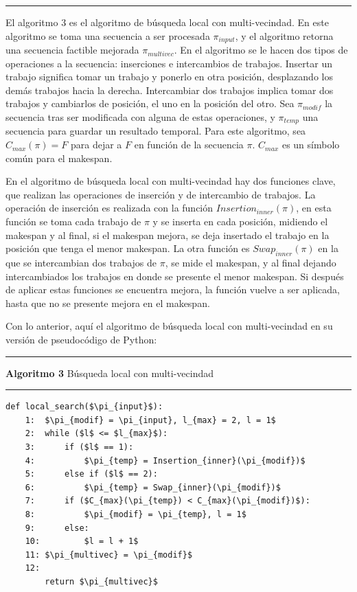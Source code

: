 \documentclass{article}
\begin{document}
\noindent\noindent
\rule{\linewidth}{0.4pt}

\vspace{\baselineskip}
El algoritmo 3 es el algoritmo de búsqueda local con multi-vecindad. En este algoritmo se toma una secuencia a ser procesada $\pi_{input}$, y el algoritmo retorna una secuencia factible mejorada $\pi_{multivec}$. En el algoritmo se le hacen dos tipos de operaciones a la secuencia: inserciones e intercambios de trabajos. Insertar un trabajo significa tomar un trabajo y ponerlo en otra posición, desplazando los demás trabajos hacia la derecha. Intercambiar dos trabajos implica tomar dos trabajos y cambiarlos de posición, el uno en la posición del otro. Sea $\pi_{modif}$ la secuencia tras ser modificada con alguna de estas operaciones, y $\pi_{temp}$ una secuencia para guardar un resultado temporal. Para este algoritmo, sea $C_{max}(\pi) = F$ para dejar a $F$ en función de la secuencia $\pi$. $C_{max}$ es un símbolo común para el makespan. \autocite{algMNIG}

\vspace{\baselineskip}
En el algoritmo de búsqueda local con multi-vecindad hay dos funciones clave, que realizan las operaciones de inserción y de intercambio de trabajos. La operación de inserción es realizada con la función $Insertion_{inner}(\pi)$, en esta función se toma cada trabajo de $\pi$ y se inserta en cada posición, midiendo el makespan y al final, si el makespan mejora, se deja insertado el trabajo en la posición que tenga el menor makespan. La otra función es $Swap_{inner}(\pi)$ en la que se intercambian dos trabajos de $\pi$, se mide el makespan, y al final dejando intercambiados los trabajos en donde se presente el menor makespan. Si después de aplicar estas funciones se encuentra mejora, la función vuelve a ser aplicada, hasta que no se presente mejora en el makespan. \autocite{algMNIG}

\vspace{\baselineskip}
Con lo anterior, aquí el algoritmo de búsqueda local con multi-vecindad en su versión de pseudocódigo de Python:

\noindent\noindent
\rule{\linewidth}{0.4pt}

\textbf{Algoritmo 3} Búsqueda local con multi-vecindad

\noindent\noindent
\rule{\linewidth}{0.4pt}

\begin{lstlisting}[mathescape=true]
    def local_search($\pi_{input}$):
    1:  $\pi_{modif} = \pi_{input}, l_{max} = 2, l = 1$
    2:  while ($l$ <= $l_{max}$):
    3:      if ($l$ == 1):
    4:          $\pi_{temp} = Insertion_{inner}(\pi_{modif})$
    5:      else if ($l$ == 2):
    6:          $\pi_{temp} = Swap_{inner}(\pi_{modif})$
    7:      if ($C_{max}(\pi_{temp}) < C_{max}(\pi_{modif})$):
    8:          $\pi_{modif} = \pi_{temp}, l = 1$
    9:      else:
    10:         $l = l + 1$
    11: $\pi_{multivec} = \pi_{modif}$
    12:
        return $\pi_{multivec}$
\end{lstlisting}
\end{document}
